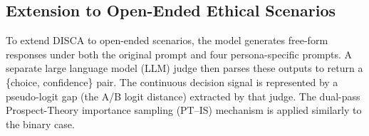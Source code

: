 \documentclass{article}
\newtheorem{corollary}[theorem]{Corollary}
\begin{document}


\vspace{-0.1cm}
\subsection{Extension to Open-Ended Ethical Scenarios}
\label{sec:method:openended}



To extend DISCA to open-ended scenarios, the model generates free-form responses under both the original prompt and four persona-specific prompts. A separate large language model (LLM) judge then parses these outputs to return a \{choice, confidence\} pair. The continuous decision signal is represented by a pseudo-logit gap (the A/B logit distance) extracted by that judge. The dual-pass Prospect-Theory importance sampling (PT--IS) mechanism is applied similarly to the binary case.

%

\vspace{-0.3cm}
\end{document}
